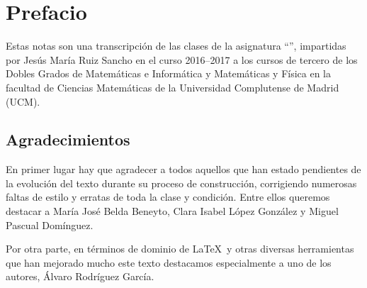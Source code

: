 \section*{Prefacio}
\label{pref}
Estas notas son una transcripción de las clases de la asignatura ``'', impartidas por Jesús María Ruiz Sancho en el curso 2016--2017 a los cursos de tercero de los Dobles Grados de Matemáticas e Informática y Matemáticas y Física en la facultad de Ciencias Matemáticas de la Universidad Complutense de Madrid (UCM).

\subsection*{Agradecimientos}
En primer lugar hay que agradecer a todos aquellos que han estado pendientes de la evolución del texto durante su proceso de construcción, corrigiendo numerosas faltas de estilo y erratas de toda la clase y condición. Entre ellos queremos destacar a María José Belda Beneyto, Clara Isabel López González y Miguel Pascual Domínguez.

Por otra parte, en términos de dominio de \LaTeX\ y otras diversas herramientas que han mejorado mucho este texto destacamos especialmente a uno de los autores, Álvaro Rodríguez García.
